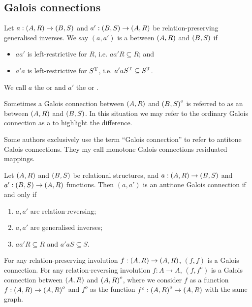 \subsection{Galois connections}
\begin{definition}
Let $a: \left( A,R \right) \to \left( B,S \right)$ and $a': \left( B,S \right) \to \left( A,R \right)$ be relation-preserving generalised inverses. We say $(a,a')$ is a  between $\left( A, R \right)$ and $\left( B, S \right)$ if
\begin{itemize}
\item $aa'$ is left-restrictive for $R$, i.e. $aa'R \subseteq R$; and
\item $a'a$ is left-restrictive for $S^{\mathrm{T}}$, i.e. $a'aS^{\mathrm{T}} \subseteq S^{\mathrm{T}}$.
\end{itemize}
We call $a$ the  or  and $a'$ the  or .

Sometimes a Galois connection between $\left( A, R \right)$ and $\left( B, S \right)^o$ is referred to as an  between $\left( A, R \right)$ and $\left( B, S \right)$. In this situation we may refer to the ordinary Galois connection as a  to highlight the difference.
\end{definition}
Some authors exclusively use the term ``Galois connection'' to refer to antitone Galois connections. They my call monotone Galois connections residuated mappings.

\begin{lemma}
Let $\left( A, R \right)$ and $\left( B, S \right)$ be relational structures, and $a: \left( A,R \right) \to \left( B,S \right)$ and $a': \left( B,S \right) \to \left( A,R \right)$ functions. Then $(a,a')$ is an antitone Galois connection \textup{if and only if}
\begin{enumerate}
\item $a, a'$ are relation-reversing;
\item $a, a'$ are generalised inverses;
\item $aa'R \subseteq R$ and $a'aS \subseteq S$.
\end{enumerate}
\end{lemma}

For any relation-preserving involution $f: \left( A,R \right) \to \left( A,R \right)$,  $(f,f)$ is a Galois connection. For any relation-reversing involution $f: A\to A$, $(f,f^o)$ is a Galois connection between $\left( A,R \right)$ and $\left( A,R \right)^o$, where we consider $f$ as a function $f: \left( A,R \right) \to \left( A,R \right)^o$ and $f^o$ as the function $f^o: \left( A,R \right)^o \to \left( A,R \right)$ with the same graph.

